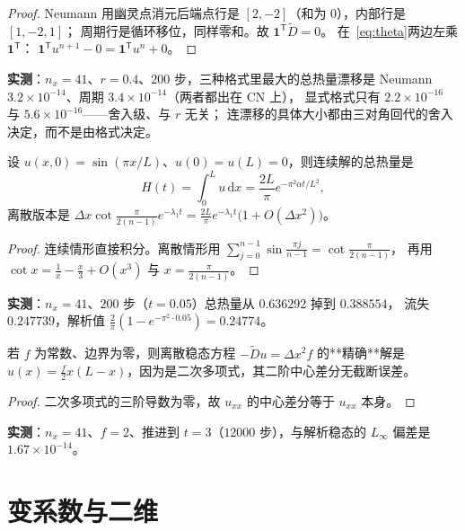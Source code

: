 \begin{proof}
Neumann 用幽灵点消元后端点行是 $[2,-2]$（和为 $0$），内部行是 $[1,-2,1]$；
周期行是循环移位，同样零和。故 $\mathbf 1^{\mathsf T}\tilde D=0$。
在~\eqref{eq:theta}两边左乘 $\mathbf 1^{\mathsf T}$：
$\mathbf 1^{\mathsf T}u^{n+1}-0=\mathbf 1^{\mathsf T}u^n+0$。
\end{proof}

\textbf{实测}：$n_x=41$、$r=0.4$、$200$ 步，三种格式里最大的总热量漂移是
Neumann $3.2\times10^{-14}$、周期 $3.4\times10^{-14}$（两者都出在 CN 上），
显式格式只有 $2.2\times10^{-16}$ 与 $5.6\times10^{-16}$——舍入级、与 $r$ 无关；
连漂移的具体大小都由三对角回代的舍入决定，而不是由格式决定。

\begin{theorem}
设 $u(x,0)=\sin(\pi x/L)$、$u(0)=u(L)=0$，则连续解的总热量是
\begin{equation}
  H(t)=\int_0^L u\,\mathrm dx=\frac{2L}\pi e^{-\pi^2\alpha t/L^2},
\end{equation}
离散版本是 $\Delta x\cot\frac{\pi}{2(n-1)}e^{-\lambda_1t}=\frac{2L}\pi e^{-\lambda_1t}
\bigl(1+O(\Delta x^2)\bigr)$。
\end{theorem}

\begin{proof}
连续情形直接积分。离散情形用
$\sum_{j=0}^{n-1}\sin\frac{\pi j}{n-1}=\cot\frac{\pi}{2(n-1)}$，
再用 $\cot x=\frac1x-\frac x3+O(x^3)$ 与 $x=\frac{\pi}{2(n-1)}$。
\end{proof}

\textbf{实测}：$n_x=41$、$200$ 步（$t=0.05$）总热量从 $0.636292$ 掉到 $0.388554$，
流失 $0.247739$，解析值 $\frac2\pi(1-e^{-\pi^2\cdot0.05})=0.24774$。

\begin{theorem}[常源项的离散稳态是精确的]
若 $f$ 为常数、边界为零，则离散稳态方程 $-\tilde Du=\Delta x^2f$ 的**精确**解是
$u(x)=\frac f2x(L-x)$，因为是二次多项式，其二阶中心差分无截断误差。
\end{theorem}

\begin{proof}
二次多项式的三阶导数为零，故 $u_{xx}$ 的中心差分等于 $u_{xx}$ 本身。
\end{proof}

\textbf{实测}：$n_x=41$、$f=2$、推进到 $t=3$（$12000$ 步），与解析稳态的
$L_\infty$ 偏差是 $1.67\times10^{-14}$。

\section{变系数与二维}

